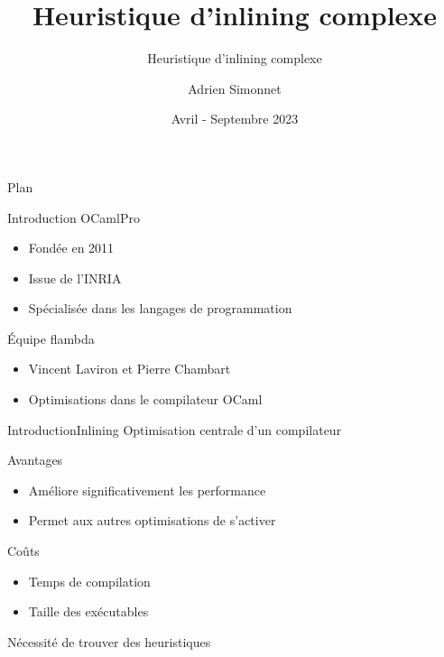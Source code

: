 \documentclass{beamer}
\title[Soutenance de stage STL]{Heuristique d'inlining complexe}
\subtitle{Heuristique d'inlining complexe}
\author{Adrien Simonnet}
\institute{Sorbonne Université}
\date{Avril - Septembre 2023}
\begin{document}
\frame{\titlepage}

\begin{frame}{Plan}
    \tableofcontents
\end{frame}

\begin{frame}{Introduction}
    OCamlPro

    \begin{itemize}
        \item Fondée en 2011
        \item Issue de l'INRIA
        \item Spécialisée dans les langages de programmation
    \end{itemize}

    Équipe flambda

    \begin{itemize}
        \item Vincent Laviron et Pierre Chambart
        \item Optimisations dans le compilateur OCaml
    \end{itemize}

\end{frame}

\begin{frame}{Introduction}{Inlining}
    Optimisation centrale d'un compilateur

    \begin{block}{Avantages}
        \begin{itemize}
            \item Améliore significativement les performance 
            \item Permet aux autres optimisations de s'activer
        \end{itemize}
    \end{block}

    \begin{block}{Coûts}
        \begin{itemize}
            \item Temps de compilation
            \item Taille des exécutables
        \end{itemize}
    \end{block}

    Nécessité de trouver des heuristiques
\end{frame}
\end{document}
